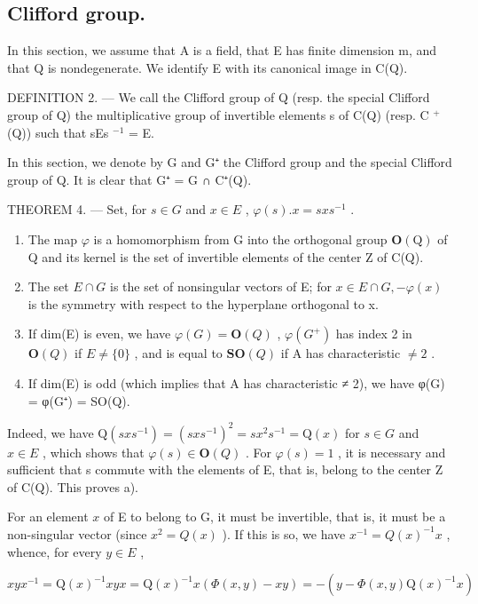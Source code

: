 \subsection{Clifford group.}

In this section, we assume that A is a field, that E has finite dimension m, and that Q is nondegenerate. We identify E with its canonical image in C(Q).

DEFINITION 2. --- We call the Clifford group of Q (resp. the special Clifford group of Q) the multiplicative group of invertible elements s of C(Q) (resp. C \(^{+}\) (Q)) such that sEs \(^{-1}\) = E.

In this section, we denote by G and G⁺ the Clifford group and the special Clifford group of Q. It is clear that G⁺ = G ∩ C⁺(Q).

THEOREM 4. --- Set, for \(s \in G\) and \(x \in E\) , \(\varphi(s). x = sxs^{-1}\) .

\begin{enumerate}
\def\labelenumi{\alph{enumi})}
\item
  The map \(\varphi\) is a homomorphism from G into the orthogonal group \(\mathbf{O}(\mathrm{Q})\) of Q and its kernel is the set of invertible elements of the center Z of C(Q).
\item
  The set \(E \cap G\) is the set of nonsingular vectors of E; for \(x \in E \cap G, -\varphi(x)\) is the symmetry with respect to the hyperplane orthogonal to x.
\item
  If dim(E) is even, we have \(\varphi(G) = \mathbf{O}(Q)\) , \(\varphi(G^{+})\) has index 2 in \(\mathbf{O}(Q)\) if \(E \neq \{0\}\) , and is equal to \(\mathbf{SO}(Q)\) if A has characteristic \(\neq 2\) .
\item
  If dim(E) is odd (which implies that A has characteristic ≠ 2), we have φ(G) = φ(G⁺) = SO(Q).
\end{enumerate}

Indeed, we have \(\mathrm{Q}(sxs^{-1}) = (sxs^{-1})^2 = sx^2s^{-1} = \mathrm{Q}(x)\) for \(s \in G\) and \(x \in E\) , which shows that \(\varphi(s) \in \mathbf{O}(Q)\) . For \(\varphi(s) = 1\) , it is necessary and sufficient that s commute with the elements of E, that is, belong to the center Z of C(Q). This proves a).

For an element \(x\) of E to belong to G, it must be invertible, that is, it must be a non-singular vector (since \(x^2 = Q(x)\) ). If this is so, we have \(x^{-1} = Q(x)^{-1}x\) , whence, for every \(y \in E\) ,

\[
x y x ^ {- 1} = \mathrm{Q} (x) ^ {- 1} x y x = \mathrm{Q} (x) ^ {- 1} x (\Phi (x, y) - x y) = - (y - \Phi (x, y) \mathrm{Q} (x) ^ {- 1} x)
\]

